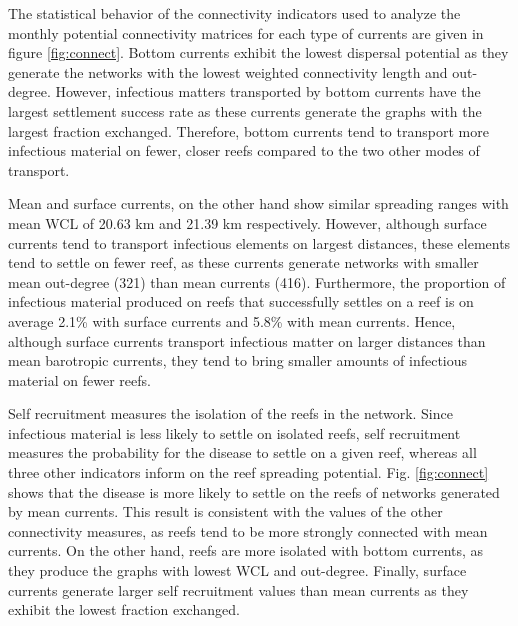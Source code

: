 \documentclass[utf8]{frontiersSCNS}
\begin{document}
The statistical behavior of the connectivity indicators used to analyze the monthly potential connectivity matrices for each type of currents are given in figure \ref{fig:connect}. Bottom currents exhibit the lowest dispersal potential as they generate the networks with the lowest weighted connectivity length and out-degree. However, infectious matters transported by bottom currents have the largest settlement success rate as these currents generate the graphs with the largest fraction exchanged. Therefore, bottom currents tend to transport more infectious material on fewer, closer reefs compared to the two other modes of transport.

Mean and surface currents, on the other hand show similar spreading ranges with mean WCL of 20.63 km and 21.39 km respectively. However, although surface currents tend to transport infectious elements on largest distances, these elements tend to settle on fewer reef, as these currents generate networks with smaller mean out-degree (321) than mean currents (416). Furthermore, the proportion of infectious material produced on reefs that successfully settles on a reef is on average 2.1\% with surface currents and 5.8\% with mean currents. Hence, although surface currents transport infectious matter on larger distances than mean barotropic currents, they tend to bring smaller amounts of infectious material on fewer reefs.

Self recruitment measures the isolation of the reefs in the network. Since infectious material is less likely to settle on isolated reefs, self recruitment measures the probability for the disease to settle on a given reef, whereas all three other indicators inform on the reef spreading potential. Fig. \ref{fig:connect} shows that the disease is more likely to settle on the reefs of networks generated by mean currents. This result is consistent with the values of the other connectivity measures, as reefs tend to be more strongly connected with mean currents. On the other hand, reefs are more isolated with bottom currents, as they produce the graphs with lowest WCL and out-degree. Finally, surface currents generate larger self recruitment values than mean currents as they exhibit the lowest fraction exchanged. 
\end{document}
